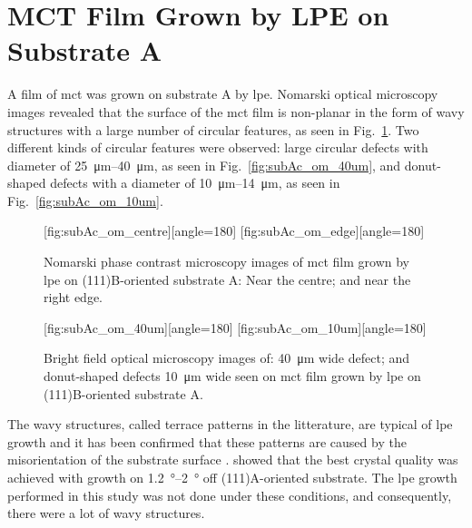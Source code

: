 \clearpage
\section{MCT Film Grown by LPE on Substrate A}\label{sec:subAc}

A film of \acl{mct} was grown on substrate A by \ac{lpe}. Nomarski optical microscopy images revealed that the surface of the \ac{mct} film is non-planar in the form of wavy structures with a large number of circular features, as seen in Fig.~\ref{fig:subAc_om}. Two different kinds of circular features were observed: large circular defects with diameter of \SIrange{25}{40}{\micro\metre}, as seen in Fig.~\ref{fig:subAc_om_40um}, and donut-shaped defects with a diameter of \SIrange{10}{14}{\micro\metre}, as seen in Fig.~\ref{fig:subAc_om_10um}. %

\begin{figure}[htbp]
    \centering
    [fig:subAc_om_centre][angle=180]
    \hfill
    [fig:subAc_om_edge][angle=180]
    \caption[Nomarski phase contrast microscopy images of \ac{mct} film grown by \ac{lpe} on substrate A.]{Nomarski phase contrast microscopy images of \ac{mct} film grown by \ac{lpe} on (111)B-oriented substrate A:  Near the centre; and  near the right edge.}
    \label{fig:subAc_om}
\end{figure}

\begin{figure}[htbp]
    \centering
    [fig:subAc_om_40um][angle=180]
    \hfill
    [fig:subAc_om_10um][angle=180]
    \caption[Bright field optical microscopy images of defects seen on \ac{mct} film grown by \ac{lpe} on substrate A.]{Bright field optical microscopy images of:  \SI{40}{\micro\metre} wide defect; and  donut-shaped defects \SI{10}{\micro\metre} wide seen on \ac{mct} film grown by \ac{lpe} on (111)B-oriented substrate A.}
    \label{fig:subAc_om_40umand10um}
\end{figure}

The wavy structures, called terrace patterns in the litterature, are typical of \ac{lpe} growth and it has been confirmed that these patterns are caused by the misorientation of the substrate surface \citep{benz1980crystals, parker1988terracing}. \citet{li1998crystallinity} showed that the best crystal quality was achieved with growth on \SIrange{1.2}{2}{\degree} off (111)A-oriented substrate. The \ac{lpe} growth performed in this study was not done under these conditions, and consequently, there were a lot of wavy structures.

